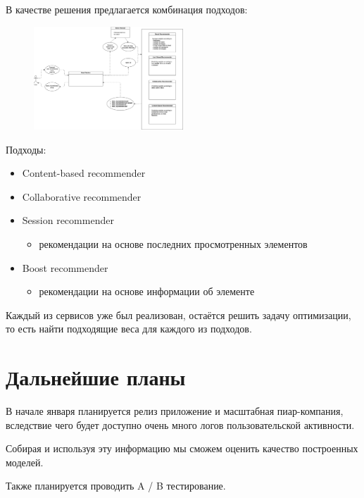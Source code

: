 \documentclass[14pt]{matmex-diploma-custom}
\begin{document}
В качестве решения предлагается комбинация подходов:

\begin{figure}[h]
	\includegraphics[width=0.5\textwidth]{./images/main.png}
	\centering
\end{figure}

Подходы:

\begin{itemize}
	\item Content-based recommender
	\item Collaborative recommender
	\item Session recommender
	      \begin{itemize}
		      \item рекомендации на основе последних просмотренных элементов
	      \end{itemize}
	\item Boost recommender
	      \begin{itemize}
		      \item рекомендации на основе информации об элементе
	      \end{itemize}
\end{itemize}

Каждый из сервисов уже был реализован, остаётся решить задачу оптимизации, то есть найти подходящие веса для каждого из подходов.

\section{Дальнейшие планы}

В начале января планируется релиз приложение и масштабная пиар-компания, вследствие чего будет доступно очень много логов пользовательской активности.

Собирая и используя эту информацию мы сможем оценить качество построенных моделей.

Также планируется проводить A / B тестирование.


\setmonofont[Mapping=tex-text]{CMU Typewriter Text}


\end{document}
